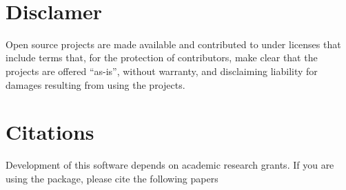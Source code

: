 \begin{titlepage}


\vspace*{1cm}

\vspace*{3cm}
\vspace*{1cm}
\vfill

\vspace*{0.5cm}
\center{\large{\today}} \\
\vspace*{0.3cm}
\end{titlepage}

\section*{Disclamer}
Open source projects are made available and contributed to under licenses that include terms that, for the protection of contributors, make clear that the projects are offered ``as-is'', without warranty, and disclaiming liability for damages resulting from using the projects. 

\section*{Citations}
Development of this software depends on academic research grants. If you are using the package, please cite the  following papers \\

